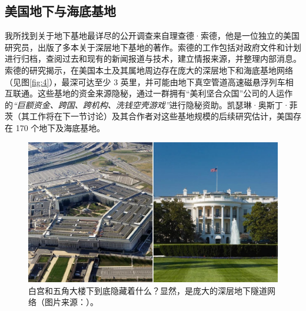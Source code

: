 \documentclass[10pt,twocolumn,letterpaper]{article}
\begin{document}
\subsection{美国地下与海底基地}

我所找到关于地下基地最详尽的公开调查来自理查德·索德，他是一位独立的美国研究员，出版了多本关于深层地下基地的著作\cite{22}。索德的工作包括对政府文件和计划进行归档，查阅过去和现有的新闻报道与技术，建立情报来源，并整理内部消息。索德的研究揭示，在美国本土及其属地周边存在庞大的深层地下和海底基地网络（见图\ref{fig:4}），最深可达至少 3 英里，并可能由地下真空管道高速磁悬浮列车相互联通。这些基地的资金来源隐秘，通过一群拥有“美利坚合众国”公司的人运作的\textit{“巨额资金、跨国、跨机构、洗钱空壳游戏”}进行隐秘资助\cite{22}。凯瑟琳·奥斯丁·菲茨（其工作将在下一节讨论）及其合作者对这些基地规模的后续研究估计，美国存在 170 个地下及海底基地\cite{16,20}。

\begin{figure}[b]
\begin{center}
   \includegraphics[width=1\linewidth]{penta.jpg}
\end{center}
   \caption{白宫和五角大楼下到底隐藏着什么？显然，是庞大的深层地下隧道网络（图片来源：\cite{31}）。}
\label{fig:3}
\label{fig:onecol}
\end{figure}
\end{document}
